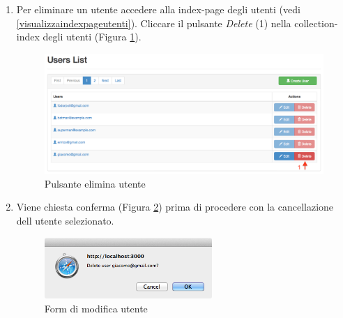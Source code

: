 		\begin{enumerate}

				\item Per eliminare un utente accedere alla index-page degli utenti (vedi \ref{visualizzaindexpageutenti}). Cliccare il pulsante \emph{Delete} (1) nella collection-index degli utenti (Figura \ref{fig:deleteUserButton}).
					\begin{figure}[H]
						\centering \includegraphics[width=1\textwidth]{img/deleteUserButton.png}
						\caption{ \label{fig:deleteUserButton} Pulsante elimina utente}
					\end{figure}

				\item Viene chiesta conferma (Figura \ref{fig:confimDeleteUser}) prima di procedere con la cancellazione dell utente selezionato.

					\begin{figure}[H]
						\centering \includegraphics[width=0.6\textwidth]{img/confimDeleteUser.png}
						\caption{ \label{fig:confimDeleteUser} Form di modifica utente}
					\end{figure}



			\end{enumerate}  
		